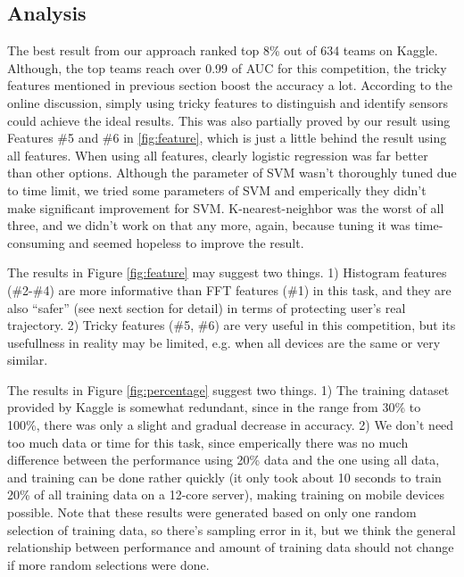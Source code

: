 \documentclass{article} %
\begin{document}

\subsection{Analysis} %
\label{sub:analysis}


The best result from our approach ranked top 8\% out of 634 teams on Kaggle. Although, the top teams reach over 0.99 of AUC for this competition, the tricky features mentioned in previous section boost the accuracy a lot. According to the online discussion, simply using tricky features to distinguish and identify sensors could achieve the ideal results. This was also partially proved by our result using Features \#5 and \#6 in \ref{fig:feature}, which is just a little behind the result using all features. When using all features, clearly logistic regression was far better than other options. Although the parameter of SVM wasn't thoroughly tuned due to time limit, we tried some parameters of SVM and emperically they didn't make significant improvement for SVM. K-nearest-neighbor was the worst of all three, and we didn't work on that any more, again, because tuning it was time-consuming and seemed hopeless to improve the result.

The results in Figure \ref{fig:feature} may suggest two things. 1) Histogram features (\#2-\#4) are more informative than FFT features (\#1) in this task, and they are also ``safer'' (see next section for detail) in terms of protecting user's real trajectory. 2) Tricky features (\#5, \#6) are very useful in this competition, but its usefullness in reality may be limited, e.g. when all devices are the same or very similar.


The results in Figure \ref{fig:percentage} suggest two things. 1) The training dataset provided by Kaggle is somewhat redundant, since in the range from 30\% to 100\%, there was only a slight and gradual decrease in accuracy. 2) We don't need too much data or time for this task, since emperically there was no much difference between the performance using 20\% data and the one using all data, and training can be done rather quickly (it only took about 10 seconds to train 20\% of all training data on a 12-core server), making training on mobile devices possible. Note that these results were generated based on only one random selection of training data, so there's sampling error in it, but we think the general relationship between performance and amount of training data should not change if more random selections were done.
\end{document}
